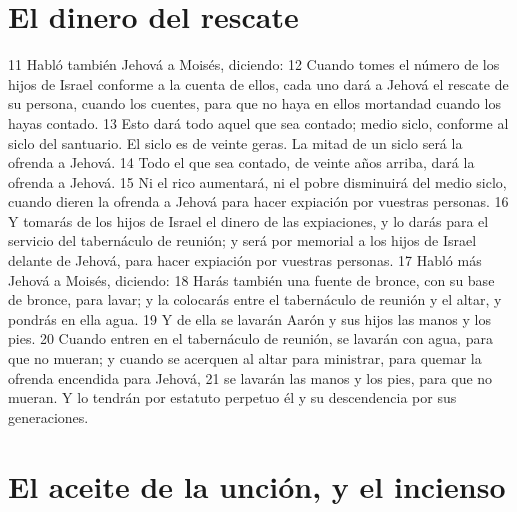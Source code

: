 \section{El dinero del rescate}

11 Habló también Jehová a Moisés, diciendo:
12 Cuando tomes el número de los hijos de Israel conforme a la cuenta de ellos, cada uno dará a Jehová el rescate de su persona, cuando los cuentes, para que no haya en ellos mortandad cuando los hayas contado.
13 Esto dará todo aquel que sea contado; medio siclo,  conforme al siclo del santuario. El siclo es de veinte geras. La mitad de un siclo será la ofrenda a Jehová.
14 Todo el que sea contado, de veinte años arriba, dará la ofrenda a Jehová.
15 Ni el rico aumentará, ni el pobre disminuirá del medio siclo,  cuando dieren la ofrenda a Jehová para hacer expiación por vuestras personas.
16 Y tomarás de los hijos de Israel el dinero de las expiaciones, y lo darás para el servicio del tabernáculo de reunión; y será por memorial a los hijos de Israel delante de Jehová, para hacer expiación por vuestras personas.
17 Habló más Jehová a Moisés, diciendo:
18 Harás también una fuente de bronce, con su base de bronce, para lavar; y la colocarás entre el tabernáculo de reunión y el altar, y pondrás en ella agua.
19 Y de ella se lavarán Aarón y sus hijos las manos y los pies.
20 Cuando entren en el tabernáculo de reunión, se lavarán con agua, para que no mueran; y cuando se acerquen al altar para ministrar, para quemar la ofrenda encendida para Jehová,
21 se lavarán las manos y los pies, para que no mueran. Y lo tendrán por estatuto perpetuo él y su descendencia por sus generaciones.

\section{El aceite de la unción, y el incienso}

